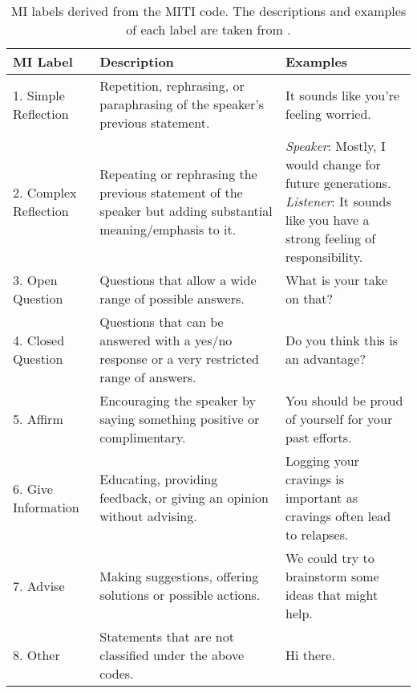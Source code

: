 \begin{table*}[hbt!]
    \begin{center}
    \scriptsize
    \setlength{\tabcolsep}{10pt}
    \renewcommand{\arraystretch}{1.2}
    \begin{tabular}{p{2.2cm}p{6cm}p{5.7cm}}
    \toprule
    \textbf{MI Label} & \textbf{Description}  & \textbf{Examples} \\ 
    \midrule
    1. Simple Reflection & Repetition, rephrasing, or paraphrasing of the speaker’s previous statement. & It sounds like you’re feeling worried. \\
    2. Complex Reflection & Repeating or rephrasing the previous statement of the speaker but adding substantial meaning/emphasis to it. & \parbox[t]{5.6cm}{\textit{Speaker}: Mostly, I would change for future generations.\\ \textit{Listener}: It sounds like you have a strong feeling of responsibility.} \\
    3. Open Question & Questions that allow a wide range of possible answers. & What is your take on that? \\
    4. Closed Question & Questions that can be answered with a yes/no response or a very restricted range of answers. & Do you think this is an advantage? \\
    5. Affirm & Encouraging the speaker by saying something positive or complimentary. & You should be proud of yourself for your past efforts. \\
    6. Give Information & Educating, providing feedback, or giving an opinion without advising. & Logging your cravings is important as cravings often lead to relapses. \\
    7. Advise & Making suggestions, offering solutions or possible actions. & We could try to brainstorm some ideas that might help. \\
    8. Other & Statements that are not classified under the above codes. & Hi there.
     \\
    \bottomrule
    \end{tabular}
    \end{center}
    \caption{MI labels derived from the MITI code. The descriptions and examples of each label are taken from \citet{welivita2022curating}.}
    \label{tab:mi_label}
\end{table*}